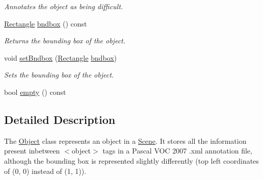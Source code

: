 \begin{DoxyCompactItemize}
\begin{DoxyCompactList}\small\item\em Annotates the object as being difficult. \end{DoxyCompactList}\item 
\hypertarget{class_f_f_l_d_1_1_object_a2dd49cdfad84ccaf0ef821438b5e8aa9}{\hyperlink{class_f_f_l_d_1_1_rectangle}{Rectangle} \hyperlink{class_f_f_l_d_1_1_object_a2dd49cdfad84ccaf0ef821438b5e8aa9}{bndbox} () const }\label{class_f_f_l_d_1_1_object_a2dd49cdfad84ccaf0ef821438b5e8aa9}

\begin{DoxyCompactList}\small\item\em Returns the bounding box of the object. \end{DoxyCompactList}\item 
\hypertarget{class_f_f_l_d_1_1_object_a2797d2e00d013b11ab1e82e6903fba6e}{void \hyperlink{class_f_f_l_d_1_1_object_a2797d2e00d013b11ab1e82e6903fba6e}{set\-Bndbox} (\hyperlink{class_f_f_l_d_1_1_rectangle}{Rectangle} \hyperlink{class_f_f_l_d_1_1_object_a2dd49cdfad84ccaf0ef821438b5e8aa9}{bndbox})}\label{class_f_f_l_d_1_1_object_a2797d2e00d013b11ab1e82e6903fba6e}

\begin{DoxyCompactList}\small\item\em Sets the bounding box of the object. \end{DoxyCompactList}\item 
bool \hyperlink{class_f_f_l_d_1_1_object_aba86e2335f3c2b2db9be38c188bf04e4}{empty} () const 
\end{DoxyCompactItemize}


\subsection{Detailed Description}
The \hyperlink{class_f_f_l_d_1_1_object}{Object} class represents an object in a \hyperlink{class_f_f_l_d_1_1_scene}{Scene}. It stores all the information present inbetween $<$object$>$ tags in a Pascal V\-O\-C 2007 .xml annotation file, although the bounding box is represented slightly differently (top left coordinates of (0, 0) instead of (1, 1)). 

